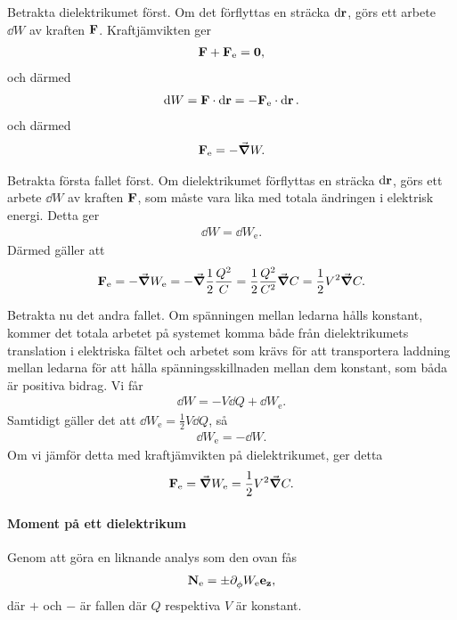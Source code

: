 Betrakta dielektrikumet först. Om det förflyttas en sträcka $\dd{\vb{r}}$, görs ett arbete $\dd{W}$ av kraften $\vb{F}$. Kraftjämvikten ger
\begin{align*}
	\vb{F} + \vb{F}_{\text{e}} = \vb{0},
\end{align*}
och därmed
\begin{align*}
	\dd{W} = \vb{F}\cdot\dd{\vb{r}} = -\vb{F}_{\text{e}}\cdot\dd{\vb{r}}.
\end{align*}
och därmed
\begin{align*}
	\vb{F}_{\text{e}} = -\grad{W}.
\end{align*}

Betrakta första fallet först. Om dielektrikumet förflyttas en sträcka $\dd{\vb{r}}$, görs ett arbete $\dd{W}$ av kraften $\vb{F}$, som måste vara lika med totala ändringen i elektrisk energi. Detta ger
\begin{align*}
	\dd{W} = \dd{W_{\text{e}}}.
\end{align*}
Därmed gäller att
\begin{align*}
	\vb{F}_{\text{e}} = -\grad{W_{\text{e}}} = -\grad{\frac{1}{2}\frac{Q^{2}}{C}} = \frac{1}{2}\frac{Q^{2}}{C^{2}}\grad{C} = \frac{1}{2}V^{2}\grad{C}.
\end{align*}

Betrakta nu det andra fallet. Om spänningen mellan ledarna hålls konstant, kommer det totala arbetet på systemet komma både från dielektrikumets translation i elektriska fältet och arbetet som krävs för att transportera laddning mellan ledarna för att hålla spänningsskillnaden mellan dem konstant, som båda är positiva bidrag. Vi får 
\begin{align*}
	\dd{W} = -V\dd{Q} + \dd{W_{\text{e}}}.
\end{align*}
Samtidigt gäller det att $\dd{W_{\text{e}}} = \frac{1}{2}V\dd{Q}$, så
\begin{align*}
	\dd{W_{\text{e}}} = -\dd{W}.
\end{align*}
Om vi jämför detta med kraftjämvikten på dielektrikumet, ger detta
\begin{align*}
	\vb{F}_{\text{e}} = \grad{W_{\text{e}}} = \frac{1}{2}V^{2}\grad{C}.
\end{align*}

\paragraph{Moment på ett dielektrikum}
Genom att göra en liknande analys som den ovan fås
\begin{align*}
	\vb{N}_{\text{e}} = \pm\partial_{\phi}^{}W_{\text{e}}\vb{e}_{\vb{z}},
\end{align*}
där $+$ och $-$ är fallen där $Q$ respektiva $V$ är konstant.